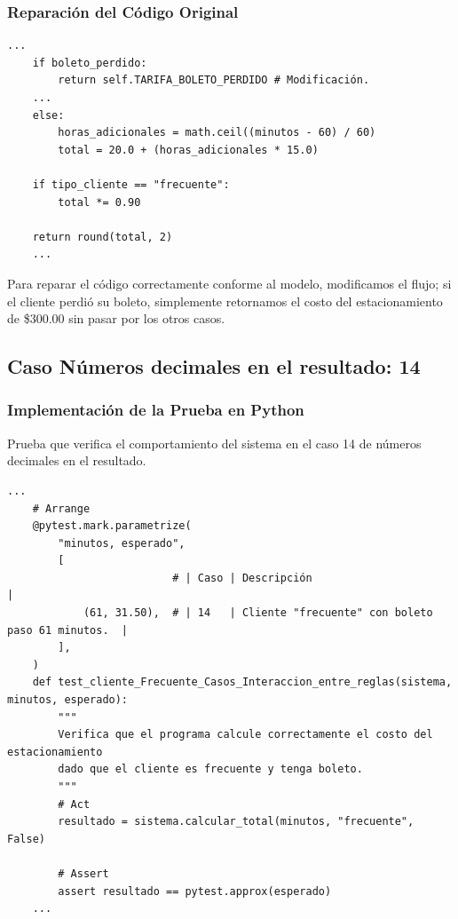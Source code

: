 \documentclass[11pt,letterpaper]{article}
\begin{document}
\subsubsection{Reparación del Código Original}
\label{sec:org7df81e5}


\begin{lstlisting}[style=practica]
    ...
    if boleto_perdido:
        return self.TARIFA_BOLETO_PERDIDO # Modificación.        
    ...
    else:
        horas_adicionales = math.ceil((minutos - 60) / 60)
        total = 20.0 + (horas_adicionales * 15.0)
	
    if tipo_cliente == "frecuente":
        total *= 0.90

    return round(total, 2)
    ...
\end{lstlisting}

Para reparar el código correctamente conforme al modelo, modificamos el flujo; si el cliente perdió su boleto, simplemente retornamos el costo del estacionamiento de \$300.00 sin pasar por los otros casos.
\subsection{Caso Números decimales en el resultado: 14}
\label{sec:org2cd77d2}

\subsubsection{Implementación de la Prueba en Python}
\label{sec:orgfed482d}

Prueba que verifica el comportamiento del sistema en el caso 14 de números decimales en el resultado.

\vspace{\baselineskip}


\begin{lstlisting}[style=practica]
    ...
    # Arrange
    @pytest.mark.parametrize(
        "minutos, esperado",
        [
                          # | Caso | Descripción                                      |
            (61, 31.50),  # | 14   | Cliente "frecuente" con boleto paso 61 minutos.  |
        ],
    )
    def test_cliente_Frecuente_Casos_Interaccion_entre_reglas(sistema, minutos, esperado):
        """
        Verifica que el programa calcule correctamente el costo del estacionamiento
        dado que el cliente es frecuente y tenga boleto.
        """
        # Act
        resultado = sistema.calcular_total(minutos, "frecuente", False)
    
        # Assert
        assert resultado == pytest.approx(esperado)
	...
\end{lstlisting}
\end{document}
